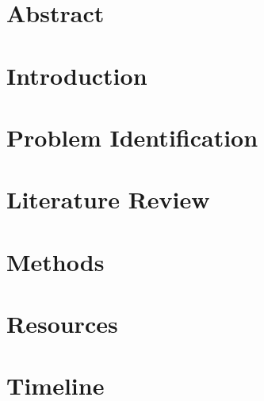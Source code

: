 \documentclass[12pt]{article}
\begin{document}

\restoregeometry

%

\setcounter{tocdepth}{5}
\tableofcontents
\pagebreak


\justify

\section*{Abstract}

\pagebreak

\section{Introduction}


\section{Problem Identification}


\section{Literature Review}


\section{Methods}


\section{Resources}


\section{Timeline}


%
\end{document}
